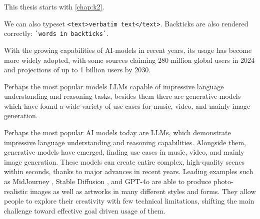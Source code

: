 \documentclass[
  a4paper,  %
  twoside,  %
  bibliography=totoc,
  headsepline,
  cleardoublepage=empty,
  parskip=half,
  draft=false
]{scrbook}
\begin{document}
This thesis starts with \cref{chap:k2}.

We can also typeset \verb|<text>verbatim text</text>|.
Backticks are also rendered correctly: \verb|`words in backticks`|.

With the growing capabilities of AI-models in recent years, its usage has become more widely adopted, with some sources claiming 280 million global users in 2024 \cite{AI-users} and projections of up to 1 billion users by 2030.

Perhaps the most popular models LLMs capable of impressive language understanding and reasoning tasks, besides them there are generative models which have found a wide variety of use cases for music, video, and mainly image generation. 

Perhaps the most popular AI models today are LLMs, which demonstrate impressive language understanding and reasoning capabilities. Alongside them, generative models have emerged, finding use cases in music, video, and mainly image generation. These models can create entire complex, high-quality scenes within seconds, thanks to major advances in recent years. Leading examples such as MidJourney \cite{midjourney}, Stable Diffusion \cite{stable-diffusion}, and GPT-4o \cite{GPT-4o} are able to produce photo-realistic images as well as artworks in many different styles and forms. They allow people to explore their creativity with few technical limitations, shifting the main challenge toward effective goal driven usage of them. 
\end{document}
